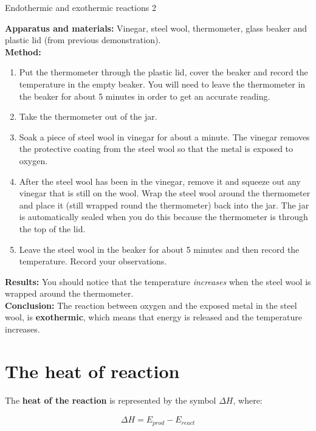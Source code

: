 \begin{g_experiment}{Endothermic and exothermic reactions 2}{

\textbf{Apparatus and materials: } Vinegar, steel wool, thermometer, glass beaker and plastic lid (from previous demonstration).\\
\textbf{Method: }
\begin{enumerate}
\item{Put the thermometer through the plastic lid, cover the beaker and record the temperature in the empty beaker. You will need to leave the thermometer in the beaker for about 5 minutes in order to get an accurate reading.}
\item{Take the thermometer out of the jar.}
\item{Soak a piece of steel wool in vinegar for about a minute. The vinegar removes the protective coating from the steel wool so that the metal is exposed to oxygen.}
\item{After the steel wool has been in the vinegar, remove it and squeeze out any vinegar that is still on the wool. Wrap the steel wool around the thermometer and place it (still wrapped round the thermometer) back into the jar. The jar is automatically sealed when you do this because the thermometer is through the top of the lid.}
\item{Leave the steel wool in the beaker for about 5 minutes and then record the temperature. Record your observations.\\}
\end{enumerate}
\textbf{Results: } You should notice that the temperature \textit{increases} when the steel wool is wrapped around the thermometer. \\
\textbf{Conclusion: } The reaction between oxygen and the exposed metal in the steel wool, is \textbf{exothermic}, which means that energy is released and the temperature increases.
}
\end{g_experiment}
\section{The heat of reaction}

The \textbf{heat of the reaction} is represented by the symbol $\Delta H$, where:

\begin{eqnarray*}
\Delta H = E_{prod} - E_{react}
\end{eqnarray*}

